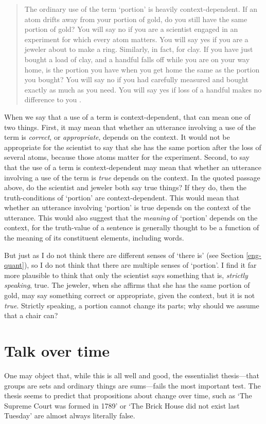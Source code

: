 \documentclass[12pt,twoside]{reedfancy}
\begin{document}
\begin{spacing}{1.25}
\begin{quote}
The ordinary use of the term `portion' is heavily context-dependent.
If an atom drifts away from your portion of gold, do you still have
the same portion of gold?  You will say no if you are a scientist
engaged in an experiment for which every atom matters. You will say
yes if you are a jeweler about to make a ring.  Similarly, in fact,
for clay.  If you have just bought a load of clay, and a handful falls
off while you are on your way home, is the portion you have when you
get home the same as the portion you bought?  You will say no if you
had carefully measured and bought exactly as much as you need.  You
will say yes if loss of a handful makes no difference to you
\citeyearpar[163]{thomson1998a}.
\end{quote}

When we say that a use of a term is context-dependent, that can mean
one of two things.  First, it may mean that whether an utterance
involving a use of the term is {\em correct}, or {\em appropriate},
depends on the context.  It would not be appropriate for the scientist
to say that she has the same portion after the loss of several atoms,
because those atoms matter for the experiment.  Second, to say that
the use of a term is context-dependent may mean that whether an
utterance involving a use of the term is {\em true} depends on the
context.  In the quoted passage above, do the scientist and jeweler
both say true things?  If they do, then the truth-conditions of
`portion' are context-dependent.  This would mean that whether an
utterance involving `portion' is true depends on the context of the
utterance.  This would also suggest that the {\em meaning} of
`portion' depends on the context, for the truth-value of a sentence is
generally thought to be a function of the meaning of its constituent
elements, including words.

But just as I do not think there are different senses of `there is'
(see Section \ref{eng-quant}), so I do not think that there are
multiple senses of `portion'.  I find it far more plausible to think
that only the scientist says something that is, {\em strictly
  speaking}, true.  The jeweler, when she affirms that she has the
same portion of gold, may say something correct or appropriate, given
the context, but it is not {\em true}.  Strictly speaking, a portion
cannot change its parts; why should we assume that a chair can?

\section{Talk over time}
\label{time-talk}
One may object that, while this is all well and good, the essentialist
thesis---that groups are sets and ordinary things are sums---fails the
most important test.  The thesis seems to predict that propositions
about change over time, such as `The Supreme Court was formed in 1789'
or `The Brick House did not exist last Tuesday' are almost always
literally false.


\end{spacing}
\end{document}
